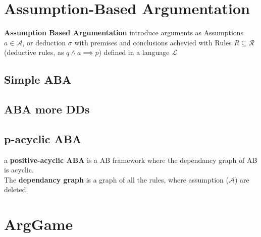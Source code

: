 \section{Assumption-Based Argumentation}
	
	\textbf{Assumption Based Argumentation} introduce arguments as Assumptions $a \in \mathcal{A}$, or deduction $\sigma$ with premises and conclusions achevied with Rules $R \subseteq \mathcal{R}$(deductive rules, as $q \wedge a \implies p$) defined in a language $\mathcal{L}$ 
	\subsection{Simple ABA}
	\subsection{ABA more DDs}
	\subsection{p-acyclic ABA}

	\begin{definition}
		a \textbf{positive-acyclic ABA} is a AB framework where the dependancy graph of AB is acyclic.\\
		The \textbf{dependancy graph} is a graph of all the rules, where assumption ($\mathcal{A}$) are deleted. 
	\end{definition}

\section{ArgGame}
